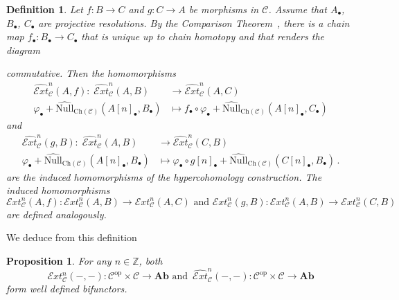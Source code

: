 \documentclass[12pt,a4paper]{article}
\numberwithin{equation}{section}
\newtheorem{prop}[thm]{Proposition}
\newtheorem{defn}[thm]{Definition}
\theoremstyle{nonumberplain}
\begin{document}
\begin{defn}\label{defn:extchainmaps}
Let $f: B \rightarrow C$ and $g: C \rightarrow A$ be morphisms in $\mathcal{C}$. Assume that $A_{\bullet}$, $B_{\bullet}$, $C_{\bullet}$ are projective resolutions. By the Comparison Theorem~\cite[Theorem~2.2.6]{wei94}, there is a chain map $f_{\bullet}: B_{\bullet} \rightarrow C_{\bullet}$ that is unique up to chain homotopy and that renders the diagram
\begin{center}
\end{center}
commutative. Then the homomorphisms
\begin{align*}
\widehat{\mathcal{E}xt}_{\mathcal{C}}^n(A, f): \;  \widehat{\mathcal{E}xt}_{\mathcal{C}}^n(A, B) &\rightarrow \widehat{\mathcal{E}xt}_{\mathcal{C}}^n(A, C) \\
\varphi_{\bullet} + \widehat{\mathrm{Null}}_{\mathrm{Ch}(\mathcal{C})}(A[n]_{\bullet}, B_{\bullet}) &\mapsto f_{\bullet} \circ \varphi_{\bullet} + \widehat{\mathrm{Null}}_{\mathrm{Ch}(\mathcal{C})}(A[n]_{\bullet}, C_{\bullet})
\end{align*}
and
\begin{align*}
\widehat{\mathcal{E}xt}_{\mathcal{C}}^n(g, B): \;  \widehat{\mathcal{E}xt}_{\mathcal{C}}^n(A, B) &\rightarrow \widehat{\mathcal{E}xt}_{\mathcal{C}}^n(C, B) \\
\varphi_{\bullet} + \widehat{\mathrm{Null}}_{\mathrm{Ch}(\mathcal{C})}(A[n]_{\bullet}, B_{\bullet}) &\mapsto \varphi_{\bullet} \circ g[n]_{\bullet} + \widehat{\mathrm{Null}}_{\mathrm{Ch}(\mathcal{C})}(C[n]_{\bullet}, B_{\bullet}) \, .
\end{align*}
are the induced homomorphisms of the hypercohomology construction. The induced homomorphisms
\[ \mathcal{E}xt_{\mathcal{C}}^n(A, f): \mathcal{E}xt_{\mathcal{C}}^n(A, B) \rightarrow \mathcal{E}xt_{\mathcal{C}}^n(A, C) \text{ and } \mathcal{E}xt_{\mathcal{C}}^n(g, B): \mathcal{E}xt_{\mathcal{C}}^n(A, B) \rightarrow \mathcal{E}xt_{\mathcal{C}}^n(C, B) \]
are defined analogously.
\end{defn}

We deduce from this definition

\begin{prop}\label{prop:hyperbifunctor}
For any $n \in \mathbb{Z}$, both
\[ \mathcal{E}xt_{\mathcal{C}}^n(-, -): \mathcal{C}^{\mathrm{op}} \times \mathcal{C} \rightarrow \mathbf{Ab} \text{ and } \, \widehat{\mathcal{E}xt}_{\mathcal{C}}^n(-, -): \mathcal{C}^{\mathrm{op}} \times \mathcal{C} \rightarrow \mathbf{Ab} \]
form well defined bifunctors.
\end{prop}
\end{document}
